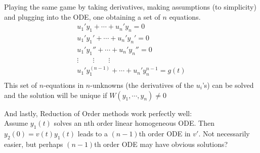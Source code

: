 \begin{enumerate}[label=\protect\circled{\arabic*}]
	Playing the same game by taking derivatives, making assumptions (to simplicity) and plugging into the ODE, one obtaining a set of $n$ equations.
	\begin{gather*}
		u_1'y_1 + \cdots + u_n'y_n = 0\\
		u_1'y_1' + \cdots + u_n'y_n' = 0\\
		u_1'y_1'' + \cdots + u_n'y_n'' = 0\\
		\vdots \quad \quad \vdots \quad \quad \vdots\\
		u_1'y_1^{(n-1)} + \cdots + u_n'y_n^{n-1} = g(t)\\
	\end{gather*}
	This set of $n$-equations in $n$-unknowns (the derivatives of the $u_i$'s) can be solved and the solution will be unique if $W(y_1, \cdots, y_n) \neq 0$
\end{enumerate}
And lastly, Reduction of Order methods work perfectly well:\\
Assume $y_1(t)$ solves an nth order linear homogeneous ODE. Then $y_2(0) = v(t)y_1(t)$ leads to a $(n-1)$th order ODE in $v'$. Not necessarily easier, but perhaps $(n-1)$th order ODE may have obvious solutions?